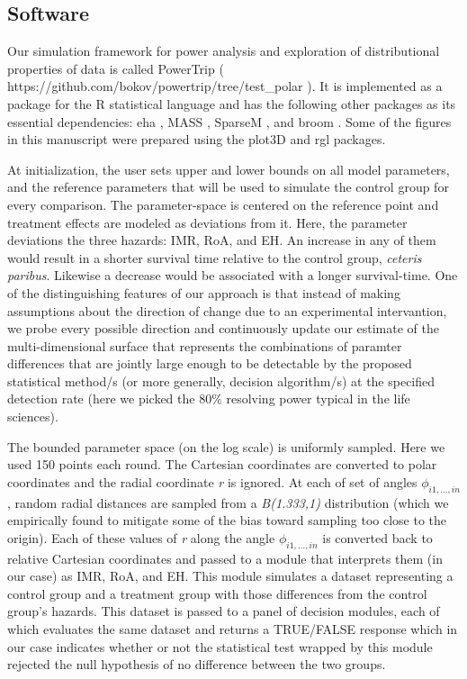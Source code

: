 \documentclass[review, authoryear]{elsarticle}
\begin{document}
\subsection{Software}\label{software}

Our simulation framework for power analysis and exploration of
distributional properties of data is called PowerTrip (
https://github.com/bokov/powertrip/tree/test\_polar ). It is implemented
as a package for the R statistical language
\citep{Rlanguage, survival-package, survival-book} and has the following
other packages as its essential dependencies: eha \citep{eha}, MASS
\citep{MASS}, SparseM \citep{SparseM}, and broom \citep{broom}. Some of
the figures in this manuscript were prepared using the plot3D
\citep{plot3D} and rgl \citep{rgl} packages.

At initialization, the user sets upper and lower bounds on all model
parameters, and the reference parameters that will be used to simulate
the control group for every comparison. The parameter-space is centered
on the reference point and treatment effects are modeled as deviations
from it. Here, the parameter deviations the three hazards: IMR, RoA, and
EH. An increase in any of them would result in a shorter survival time
relative to the control group, \emph{ceteris paribus}. Likewise a
decrease would be associated with a longer survival-time. One of the
distinguishing features of our approach is that instead of making
assumptions about the direction of change due to an experimental
intervantion, we probe every possible direction and continuously update
our estimate of the multi-dimensional surface that represents the
combinations of paramter differences that are jointly large enough to be
detectable by the proposed statistical method/s (or more generally,
decision algorithm/s) at the specified detection rate (here we picked
the 80\% resolving power typical in the life sciences).

The bounded parameter space (on the log scale) is uniformly sampled.
Here we used 150 points each round. The Cartesian coordinates are
converted to polar coordinates and the radial coordinate \emph{r} is
ignored. At each of set of angles \(\phi_{i1,\dots,in}\), random radial
distances are sampled from a \emph{B(1.333,1)} distribution (which we
empirically found to mitigate some of the bias toward sampling too close
to the origin). Each of these values of \emph{r} along the angle
\(\phi_{i1,\dots,in}\) is converted back to relative Cartesian
coordinates and passed to a module that interprets them (in our case) as
IMR, RoA, and EH. This module simulates a dataset representing a control
group and a treatment group with those differences from the control
group's hazards. This dataset is passed to a panel of decision modules,
each of which evaluates the same dataset and returns a TRUE/FALSE
response which in our case indicates whether or not the statistical test
wrapped by this module rejected the null hypothesis of no difference
between the two groups.
\end{document}
